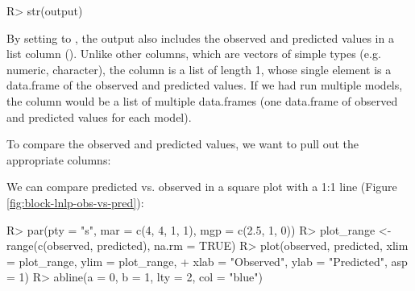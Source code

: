 \documentclass[article]{jss}
\begin{document}
\begin{Schunk}
\begin{Sinput}
R> str(output)
\end{Sinput}
\end{Schunk}

By setting  to , the output also includes the observed and predicted values in a list column (). Unlike other columns, which are vectors of simple types (e.g. numeric, character), the  column is a list of length 1, whose single element is a data.frame of the observed and predicted values. If we had run multiple models, the  column would be a list of multiple data.frames (one data.frame of observed and predicted values for each model).

To compare the observed and predicted values, we want to pull out the appropriate columns:
\begin{Schunk}
\end{Schunk}

We can compare predicted vs. observed in a square plot with a 1:1 line (Figure \ref{fig:block-lnlp-obs-vs-pred}):

\begin{Schunk}
\begin{Sinput}
R> par(pty = "s", mar = c(4, 4, 1, 1), mgp = c(2.5, 1, 0))
R> plot_range <- range(c(observed, predicted), na.rm = TRUE)
R> plot(observed, predicted, xlim = plot_range, ylim = plot_range,
+       xlab = "Observed", ylab = "Predicted", asp = 1)
R> abline(a = 0, b = 1, lty = 2, col = "blue")
\end{Sinput}
\end{Schunk}
\end{document}
